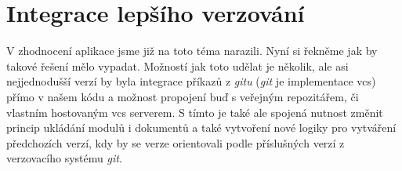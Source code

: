 \clearpage

\section{Integrace lepšího verzování}

V zhodnocení aplikace jsme již na toto téma narazili. Nyní si řekněme jak by takové řešení mělo vypadat. Možností jak toto udělat je několik,
ale asi nejjednodušší verzí by byla integrace příkazů z \textit{gitu} (\textit{git} je implementace \gls{vcs}) přímo v našem kódu a možnost propojení buď s veřejným repozitářem,
či vlastním hostovaným \gls{vcs} serverem. S tímto je také ale spojená nutnost změnit princip ukládání modulů i dokumentů a také vytvoření nové
logiky pro vytváření předchozích verzí, kdy by se verze orientovali podle příslušných verzí z verzovacího systému \textit{git}.